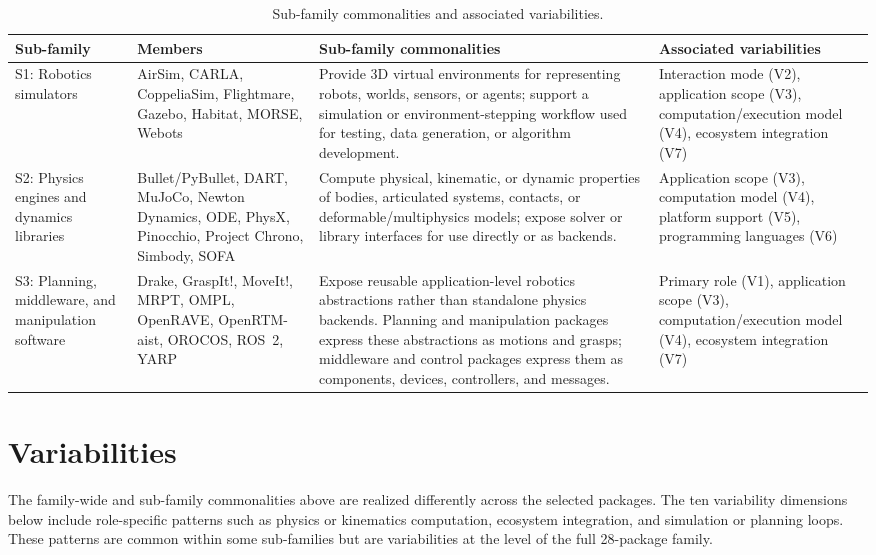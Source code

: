 \begin{table}[H]
\centering
\caption{Sub-family commonalities and associated variabilities.}
\label{tab:subfamily-commonalities}
\singlespacing
\footnotesize
\setlength{\tabcolsep}{2.5pt}
\begin{tabular}{@{}P{2.4cm}P{3.8cm}P{4.3cm}P{2.4cm}@{}}
\toprule
\textbf{Sub-family} & \textbf{Members} & \textbf{Sub-family commonalities} & \textbf{Associated variabilities} \\
\midrule
S1: Robotics simulators & AirSim, CARLA, CoppeliaSim, Flightmare, Gazebo, Habitat, MORSE, Webots & Provide 3D virtual environments for representing robots, worlds, sensors, or agents; support a simulation or environment-stepping workflow used for testing, data generation, or algorithm development. & Interaction mode (V2), application scope (V3), computation/execution model (V4), ecosystem integration (V7) \\
\hline
S2: Physics engines and dynamics libraries & Bullet/PyBullet, DART, MuJoCo, Newton Dynamics, ODE, PhysX, Pinocchio, Project Chrono, Simbody, SOFA & Compute physical, kinematic, or dynamic properties of bodies, articulated systems, contacts, or deformable/multiphysics models; expose solver or library interfaces for use directly or as backends. & Application scope (V3), computation model (V4), platform support (V5), programming languages (V6) \\
\hline
S3: Planning, middleware, and manipulation software & Drake, GraspIt!, MoveIt!, MRPT, OMPL, OpenRAVE, OpenRTM-\allowbreak aist, OROCOS, ROS~2, YARP & Expose reusable application-level robotics abstractions rather than standalone physics backends. Planning and manipulation packages express these abstractions as motions and grasps; middleware and control packages express them as components, devices, controllers, and messages. & Primary role (V1), application scope (V3), computation/execution model (V4), ecosystem integration (V7) \\
\bottomrule
\end{tabular}
\end{table}

\section{Variabilities}
\label{sec:variabilities}

The family-wide and sub-family commonalities above are realized differently across the selected packages. The ten variability dimensions below include role-specific patterns such as physics or kinematics computation, ecosystem integration, and simulation or planning loops. These patterns are common within some sub-families but are variabilities at the level of the full 28-package family.

